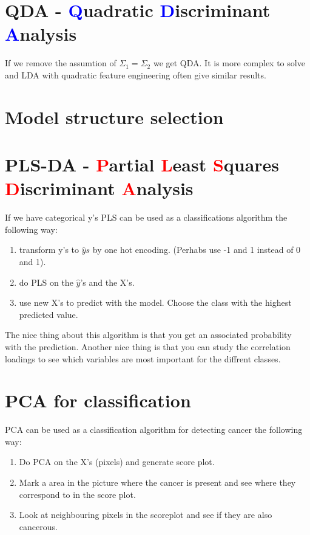 

\section{QDA - \textcolor{blue}{Q}uadratic \textcolor{blue}{D}iscriminant \textcolor{blue}{A}nalysis}
If we remove the assumtion of $\Sigma_1 = \Sigma_2$ we get QDA. It is more complex to solve and LDA with quadratic feature engineering often give similar results.

\section{Model structure selection}

\section{PLS-DA - \textcolor{red}{P}artial \textcolor{red}{L}east \textcolor{red}{S}quares \textcolor{red}{D}iscriminant \textcolor{red}{A}nalysis}
If we have categorical y's PLS can be used as a classifications algorithm the following way:
\begin{enumerate}
    \item transform y's to $\hat{y}s$ by one hot encoding. (Perhabs use -1 and 1 instead of 0 and 1).
    \item do PLS on the $\hat{y}$'s and the X's.
    \item use new X's to predict with the model. Choose the class with the highest predicted value.
\end{enumerate}
The nice thing about this algorithm is that you get an associated probability with the prediction. \newline
Another nice thing is that you can study the correlation loadings to see which variables are most important for the diffrent classes. \newline

\section{PCA for classification}
PCA can be used as a classification algorithm for detecting cancer the following way:
\begin{enumerate}
    \item Do PCA on the X's (pixels) and generate score plot.
    \item Mark a area in the picture where the cancer is present and see where they correspond to in the score plot.
    \item Look at neighbouring pixels in the scoreplot and see if they are also cancerous.
\end{enumerate}


